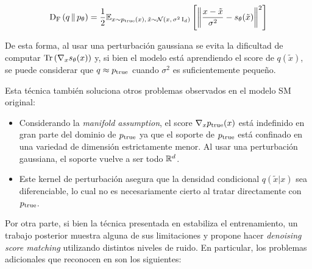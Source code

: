 \begin{equation}
    \label{eq:fisher_dsm}
    \operatorname{D_F}\left(q\,\|\,p_\theta\right) = \frac{1}{2}\mathbb{E}_{x\sim p_{\operatorname{true}}(x),\,\tilde{x}\sim \mathcal{N}\left(x,\,\sigma^2 \operatorname{I}_{d}\right)}\left[\left\lVert \frac{x-\tilde{x}}{\sigma^2} - s_\theta(\tilde{x}) \right\rVert^2\right]
\end{equation}

De esta forma, al usar una perturbación gaussiana se evita la dificultad de computar $\operatorname{Tr}\left(\nabla_x s_\theta(x)\right)$ y, si bien el modelo está aprendiendo el score de $q(\tilde{x})$, se puede considerar que $q\approx p_{\operatorname{true}}$ cuando $\sigma^2$ es suficientemente pequeño.

Esta técnica también soluciona otros problemas observados en el modelo SM original:

\begin{itemize}
    \item Considerando la \textit{manifold assumption}, el score $\nabla_x p_{\operatorname{true}}(x)$ está indefinido en gran parte del dominio de $p_{\operatorname{true}}$ ya que el soporte de $p_{\operatorname{true}}$ está confinado en una variedad de dimensión estrictamente menor. Al usar una perturbación gaussiana, el soporte vuelve a ser todo $\mathbb{R}^d$.
    \item Este kernel de perturbación asegura que la densidad condicional $q(\tilde{x}|x)$ sea diferenciable, lo cual no es necesariamente cierto al tratar directamente con $p_{\operatorname{true}}$.
\end{itemize}

Por otra parte, si bien la técnica presentada en \cite{DSM} estabiliza el entrenamiento, un trabajo posterior muestra alguna de sus limitaciones y propone hacer \textit{denoising score matching} utilizando distintos niveles de ruido. En particular, los problemas adicionales que reconocen en \cite{song2020generative} son los siguientes:


